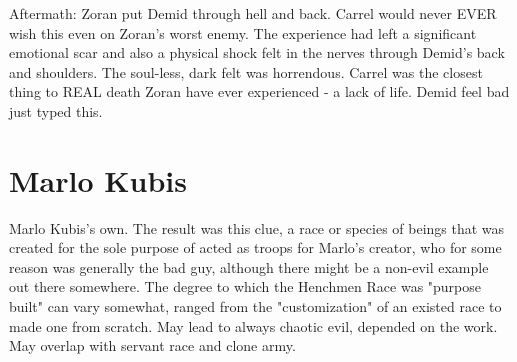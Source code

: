 \documentclass[12pt]{book}
\begin{document}
Aftermath: Zoran put Demid through hell and back. Carrel would never EVER wish this even on Zoran's worst enemy. The experience had left a significant emotional scar and also a physical shock felt in the nerves through Demid's back and shoulders. The soul-less, dark felt was horrendous. Carrel was the closest thing to REAL death Zoran have ever experienced - a lack of life. Demid feel bad just typed this.



\chapter{Marlo Kubis}

Marlo Kubis's own. The result was this clue, a race or species of beings that was created for the sole purpose of acted as troops for Marlo's creator, who for some reason was generally the bad guy, although there might be a non-evil example out there somewhere. The degree to which the Henchmen Race was "purpose built" can vary somewhat, ranged from the "customization" of an existed race to made one from scratch. May lead to always chaotic evil, depended on the work. May overlap with servant race and clone army.
\end{document}
